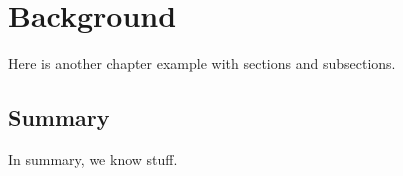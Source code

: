 \chapter{Background}
\label{chap:bg}

Here is another chapter example with sections and subsections.




\section{Summary}

In summary, we know stuff.